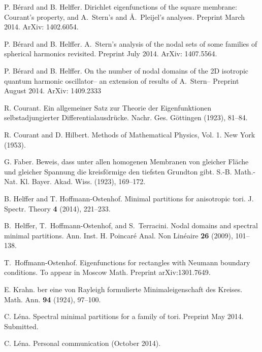 \documentclass[a4paper,reqno,11pt]{amsart}
\theoremstyle{remark}
\theoremstyle{definition}
\numberwithin{equation}{section}
\begin{document}
\begin{thebibliography}{1}

 P. B\'erard and B. Helffer.
\newblock Dirichlet eigenfunctions of the square membrane:
Courant's property, and A.~Stern's  and  {\AA}.~Pleijel's analyses.
\newblock Preprint March 2014. ArXiv: 1402.6054.

 P. B\'erard and B. Helffer.
\newblock A.~Stern's analysis of the nodal sets of some families of
spherical harmonics revisited.
\newblock Preprint July 2014. ArXiv: 1407.5564.

  P. B\'erard and B. Helffer.
\newblock On the number of nodal domains of the
2D isotropic quantum harmonic oscillator-- an extension of results
of A.~Stern--
\newblock Preprint August 2014. ArXiv: 1409.2333

 R. Courant.
\newblock  Ein allgemeiner Satz zur Theorie der Eigenfunktionen selbstadjungierter Differentialausdr\"ucke.
\newblock Nachr. Ges. G\"ottingen (1923), 81--84.

 R. Courant and D. Hilbert.
\newblock Methods of Mathematical Physics, Vol. 1.
\newblock New York (1953).

 G. Faber.
\newblock Beweis, dass unter allen homogenen Membranen von gleicher Fl\"ache
und gleicher Spannung die kreisf\"ormige den tiefsten Grundton gibt.
\newblock S.-B. Math.-Nat. Kl. Bayer. Akad. Wiss. (1923), 169--172.

  B. Helffer and T. Hoffmann-Ostenhof.
\newblock Minimal partitions for anisotropic tori.
\newblock J. Spectr. Theory {\bf 4} (2014), 221--233.

 B.~Helffer, T.~Hoffmann-Ostenhof, and S.~Terracini.
\newblock Nodal domains and spectral minimal partitions.
\newblock Ann. Inst. H. Poincar\'e Anal. Non
  Lin\'eaire {\bf 26} (2009), 101--138.

T.~Hoffmann-Ostenhof.
\newblock Eigenfunctions for rectangles with Neumann boundary conditions.
\newblock To appear in Moscow Math.  Preprint arXiv:1301.7649.

E. Krahn.
ber eine von Rayleigh formulierte Minimaleigenschaft des Kreises.
\newblock Math. Ann. {\bf 94} (1924), 97--100.

 C. L{\'e}na.
  \newblock Spectral minimal partitions for a family of tori.
  \newblock Preprint May 2014. Submitted.
  

 C. L{\'e}na.
  \newblock Personal communication (October 2014).


\end{thebibliography}
\end{document}
